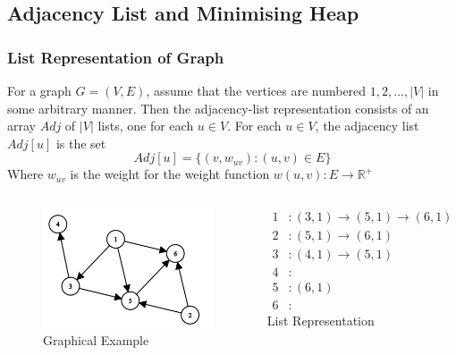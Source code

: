 \documentclass[a4paper]{beamer}
\begin{document}
\subsection{Adjacency List and Minimising Heap}
\begin{frame}
	\frametitle{List Representation of Graph}	
	For a graph \( G = (V, E) \), assume that the vertices are numbered \( 1, 2, \hdots, \lvert{ V }\rvert  \) in some arbitrary manner. Then the adjacency-list representation consists of an array \( Adj \) of \( \lvert{ V }\rvert  \) lists, one for each \( u \in V \). For each \( u \in V\), the adjacency list \( Adj[u] \) is the set
	\[
		Adj[u] = \{ (v, w_{uv}) : (u, v) \in E\}
	\]
	Where \( w_{uv} \) is the weight for the weight function \( w(u, v) : E \rightarrow \mathbb{R}^+ \) 
\end{frame}

\begin{frame}
	\begin{columns}
	\begin{figure}
		\includegraphics[scale=0.5]{./pict/exampleGraph.png}
		\caption{Graphical Example}
	\end{figure}

	\begin{align*}
		1 &: (3, 1) \rightarrow (5, 1) \rightarrow (6, 1)\\
		2 &: (5, 1) \rightarrow (6, 1) \\
		3 &: (4, 1) \rightarrow (5, 1) \\
		4 &: \\
		5 &: (6, 1)\\
		6 &: 
	\end{align*}			
	\centering List Representation
			
	\end{columns}
\end{frame}
\end{document}
